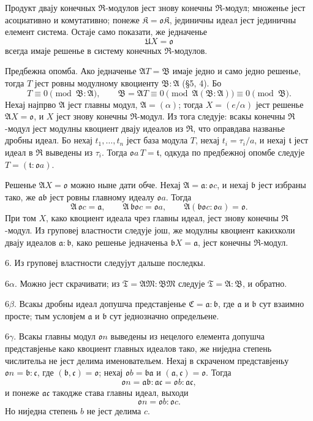 \documentclass[11pt]{article}
\providecommand{\mR}{\mathfrak{R}}
\providecommand{\mK}{\mathfrak{K}}
\providecommand{\ma}{\mathfrak{a}}
\providecommand{\mb}{\mathfrak{b}}
\providecommand{\mc}{\mathfrak{c}}
\providecommand{\mo}{\mathfrak{o}}
\providecommand{\mt}{\mathfrak{t}}
\begin{document}
Продукт двају конечных $\mR$-модулов јест знову конечны $\mR$-модул; множенье јест асоциативно и комутативно; понеже $\mK=\mo\mK$, јединичны идеал јест јединичны елемент система. Остаје само показати, же једначенье
\[
        \mathfrak U X=\mo
\]
всегда имаје решенье в систему конечных $\mR$-модулов.

Предбежна опомба. Ако једначенье $\mathfrak A T=\mathfrak B$ имаје једно и само једно решенье, тогда $T$ јест ровны модулному квоциенту $\mathfrak B:\mathfrak A$ (§5, 4). Бо
\[
        T\equiv0\pmod{\mathfrak B:\mathfrak A},
        \qquad
        \mathfrak B=\mathfrak A T\equiv0\pmod{\mathfrak A(\mathfrak B:\mathfrak A)}\equiv0\pmod{\mathfrak B}.
\]
Нехај најпрво $\mathfrak A$ јест главны модул, $\mathfrak A=(\alpha)$; тогда $X=(e/\alpha)$ јест решенье $\mathfrak A X=\mo$, и $X$ јест знову конечны $\mR$-модул. Из тога следује: всакы конечны $\mR$-модул јест модулны квоциент двају идеалов из $\mR$, что оправдава названье дробны идеал. Бо нехај $t_1,\ldots,t_n$ јест база модула $T$, нехај $t_i=\tau_i/a$, и нехај $\mt$ јест идеал в $\mR$ выведены из $\tau_i$. Тогда $\mo a\,T=\mt$, одкуда по предбежној опомбе следује $T=(\mt:\mo a)$.

Решенье $\mathfrak A X=\mo$ можно ныне дати обче. Нехај $\mathfrak A=\ma:\mo c$, и нехај $\mb$ јест избраны тако, же $\ma\mb$ јест ровны главному идеалу $\mo a$. Тогда
\[
        \mathfrak A\,\mo c=\ma,
        \qquad \mathfrak A\,\mb\mo c=\mo a,
        \qquad \mathfrak A(\mb\mo c:\mo a)=\mo.
\]
При том $X$, како квоциент идеала чрез главны идеал, јест знову конечны $\mR$-модул. Из груповеј властности следује још, же модулны квоциент какихколи двају идеалов $\ma:\mb$, како решенье једначеньа $\mb X=\ma$, јест конечны $\mR$-модул.

6. Из груповеј властности следујут дальше последкы.

6$\alpha$. Можно јест скрачивати; из $\mathfrak T=\mathfrak A\mathfrak M:\mathfrak B\mathfrak M$ следује $\mathfrak T=\mathfrak A:\mathfrak B$, и обратно.

6$\beta$. Всакы дробны идеал допушча представјенье $\mathfrak C=\ma:\mb$, где $\ma$ и $\mb$ сут взаимно просте; тым условјем $\ma$ и $\mb$ сут једнозначно определьене.

6$\gamma$. Всакы главны модул $\mo n$ выведены из нецелого елемента допушча представјенье како квоциент главных идеалов тако, же ниједна степень числительа не јест делима именовательем. Нехај в скраченом представјеньу $\mo n=\mb:\mc$, где $(\mb,\mc)=\mo$; нехај $\mo b=\mb\ma$ и $(\ma,\mc)=\mo$. Тогда
\[
        \mo n=\ma\mb:\ma\mc=\mo b:\ma\mc,
\]
и понеже $\ma\mc$ такодже става главны идеал, выходи
\[
        \mo n=\mo b:\mo c.
\]
Но ниједна степень $b$ не јест делима $c$.
\end{document}
